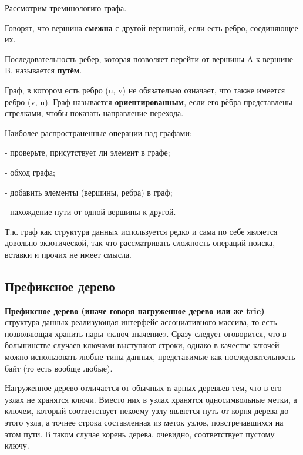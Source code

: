 \documentclass[utf8,14pt,a4paper,oneside,russian]{book}
\begin{document}
	Рассмотрим треминологию графа.
	
	Говорят, что вершина \textbf{смежна} с другой вершиной, если есть ребро, соединяющее их.
	
	Последовательность ребер, которая позволяет перейти от вершины A к вершине B, называется \textbf{путём}.
	
	Граф, в котором есть ребро (u, v) не обязательно означает, что также имеется ребро (v, u). Граф называется \textbf{ориентированным}, если его рёбра представлены стрелками, чтобы показать направление перехода.
	
	Наиболее распространенные операции над графами:
	
	- проверьте, присутствует ли элемент в графе;
	
	- обход графа;
	
	- добавить элементы (вершины, ребра) в граф;
	
	- нахождение пути от одной вершины к другой.
	
	Т.к. граф как структура данных используется редко и сама по себе является довольно экзотической, так что рассматривать сложность операций поиска, вставки и прочих не имеет смысла.
	 	
	\subsection{Префиксное дерево}
	
	\textbf{Префиксное дерево (иначе говоря нагруженное дерево или же trie)} - структура данных реализующая интерфейс ассоциативного массива, то есть позволяющая хранить пары «ключ-значение». Сразу следует оговорится, что в большинстве случаев ключами выступают строки, однако в качестве ключей можно использовать любые типы данных, представимые как последовательность байт (то есть вообще любые).
	
	Нагруженное дерево отличается от обычных n-арных деревьев тем, что в его узлах не хранятся ключи. Вместо них в узлах хранятся односимвольные метки, а ключем, который соответствует некоему узлу является путь от корня дерева до этого узла, а точнее строка составленная из меток узлов, повстречавшихся на этом пути. В таком случае корень дерева, очевидно, соответствует пустому ключу.
	
\end{document}
